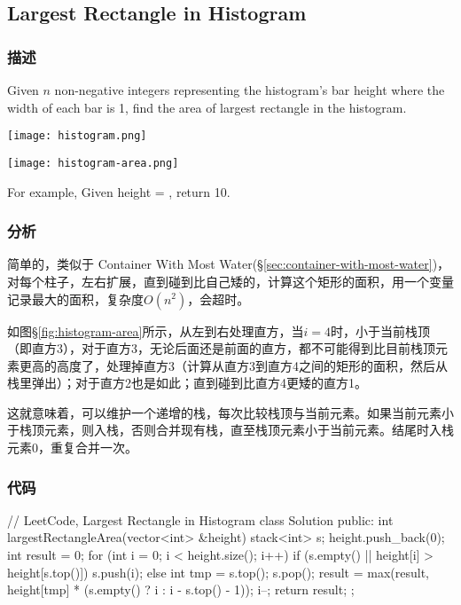 \subsection{Largest Rectangle in Histogram} %
\label{sec:largest-rectangle-in-histogram}


\subsubsection{描述}
Given $n$ non-negative integers representing the histogram's bar height where the width of each bar is 1, find the area of largest rectangle in the histogram.

\begin{center}
\texttt{[image: histogram.png]}\\
\label{fig:histogram}
\end{center}

\begin{center}
\texttt{[image: histogram-area.png]}\\
\label{fig:histogram-area}
\end{center}

For example,
Given height = \fn{[2,1,5,6,2,3]},
return 10.


\subsubsection{分析}
简单的，类似于 Container With Most Water(\S \ref{sec:container-with-most-water})，对每个柱子，左右扩展，直到碰到比自己矮的，计算这个矩形的面积，用一个变量记录最大的面积，复杂度$O(n^2)$，会超时。

如图\S \ref{fig:histogram-area}所示，从左到右处理直方，当$i=4$时，小于当前栈顶（即直方3），对于直方3，无论后面还是前面的直方，都不可能得到比目前栈顶元素更高的高度了，处理掉直方3（计算从直方3到直方4之间的矩形的面积，然后从栈里弹出）；对于直方2也是如此；直到碰到比直方4更矮的直方1。

这就意味着，可以维护一个递增的栈，每次比较栈顶与当前元素。如果当前元素小于栈顶元素，则入栈，否则合并现有栈，直至栈顶元素小于当前元素。结尾时入栈元素0，重复合并一次。


\subsubsection{代码}
\begin{Code}
// LeetCode, Largest Rectangle in Histogram
class Solution {
public:
    int largestRectangleArea(vector<int> &height) {
        stack<int> s;
        height.push_back(0);
        int result = 0;
        for (int i = 0; i < height.size(); i++) {
            if (s.empty() || height[i] > height[s.top()])
                s.push(i);
            else {
                int tmp = s.top();
                s.pop();
                result = max(result,
                        height[tmp] * (s.empty() ? i : i - s.top() - 1));
                i--;
            }
        }
        return result;
    }
};
\end{Code}


